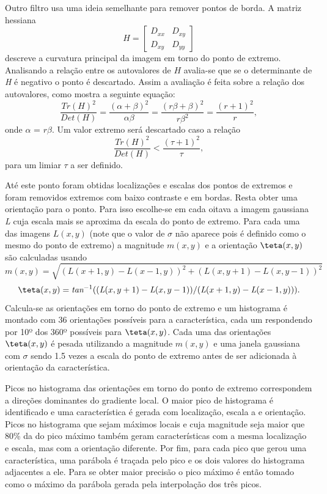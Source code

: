 Outro filtro usa uma ideia semelhante para remover pontos de borda. A matriz hessiana \[ \textit{H} = \left[ \begin{array}{cc}
D_{xx} & D_{xy} \\ 
D_{xy} & D_{yy}
\end{array} \right]  \] descreve a curvatura principal da imagem em torno do ponto de extremo. Analisando a relação entre os autovalores de $\textit{H}$ avalia-se que se o determinante de \textit{H} é negativo o ponto é descartado. Assim a avaliação é feita sobre a relação dos autovalores, como mostra a seguinte equação: \begin{equation}\label{equacaoseg}
 \frac{\textit{Tr}(H)^2}{\textit{Det}(H)} = \frac{(\alpha + \beta)^2}{\alpha\beta} = \frac{(r\beta + \beta)^2}{r\beta^2} = \frac{(r + 1)^2}{r}, 
\end{equation} 
 onde $\alpha$ = $r\beta$. Um valor extremo será descartado caso a relação \[ \frac{\textit{Tr}(H)^2}{\textit{Det}(H)} < \frac{(\tau + 1)^2}{\tau}, \] para um limiar $\tau$ a ser definido.  

Até este ponto foram obtidas localizações e escalas dos pontos de extremos e foram removidos extremos com baixo contraste e em bordas. Resta obter uma orientação para o ponto. Para isso escolhe-se em cada oitava a imagem gaussiana \textit{L} cuja escala mais se aproxima da escala do ponto de extremo. Para cada uma das imagens $\textit{L}(x,y)$ (note que o valor de $\sigma$ não aparece pois é definido como o mesmo do ponto de extremo) a magnitude $\textit{m}(x,y)$ e a orientação $\teta(x,y)$ são calculadas usando \[ \textit{m}(x,y) = \sqrt{(\textit{L}(x  +1,y) - \textit{L}(x - 1,y))^2 + (\textit{L}(x,y + 1) - \textit{L}(x,y - 1))^2} \] \[ \teta(x,y) = \textit{tan}^{-1}((\textit{L}(x,y +1) - \textit{L}(x,y - 1))/(\textit{L}(x + 1,y) - \textit{L}(x - 1,y))).\]
Calcula-se as orientações em torno do ponto de extremo e um histograma é montado com 36 orientações possíveis para a característica, cada um respondendo por 10º dos 360º possíveis para $\teta(x,y)$. Cada uma das orientações $\teta(x,y)$ é pesada utilizando a magnitude $\textit{m}(x,y)$ e uma janela gaussiana com $\sigma$ sendo 1.5 vezes a escala do ponto de extremo antes de ser adicionada à orientação da característica.

Picos no histograma das orientações em torno do ponto de extremo correspondem a direções dominantes do gradiente local. O maior pico de histograma é identificado e uma característica é gerada com localização, escala a e orientação. Picos no histograma que sejam máximos locais e cuja magnitude seja maior que 80\% da do pico máximo também geram características com a mesma localização e escala, mas com a orientação diferente. Por fim, para cada pico que gerou uma característica, uma parábola é traçada pelo pico e os dois valores do histograma adjacentes a ele. Para se obter maior precisão o pico máximo é então tomado como o máximo da parábola gerada pela interpolação dos três picos.


